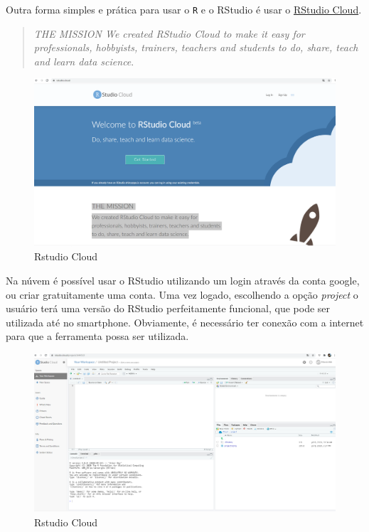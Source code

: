 \documentclass[
]{book}
\begin{document}
Outra forma simples e prática para usar o \texttt{R} e o RStudio é usar o \href{https://rstudio.cloud/}{RStudio Cloud}.

\begin{quote}
\emph{THE MISSION
We created RStudio Cloud to make it easy for professionals, hobbyists, trainers, teachers and students to do, share, teach and learn data science}. \citep{rstudiocloud}
\end{quote}

\begin{figure}
\includegraphics[width=0.9\linewidth]{Figuras/RStudioCloud} \caption{Rstudio Cloud}\label{fig:rstudiocloud}
\end{figure}

Na núvem é possível usar o RStudio utilizando um login através da conta google, ou criar gratuitamente uma conta. Uma vez logado, escolhendo a opção \emph{project} o usuário terá uma versão do RStudio perfeitamente funcional, que pode ser utilizada até no smartphone. Obviamente, é necessário ter conexão com a internet para que a ferramenta possa ser utilizada.

\begin{figure}
\includegraphics[width=0.9\linewidth]{Figuras/RStudioCloud2} \caption{Rstudio Cloud}\label{fig:rstudiocloud2}
\end{figure}
\end{document}
